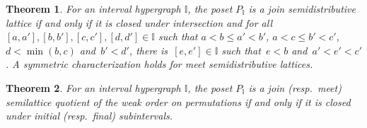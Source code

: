 \documentclass[reqno]{amsart}
\newtheorem{theoremA}{Theorem}
\theoremstyle{definition}
\newcommand{\II}{\mathbb I} %
\begin{document}
\begin{theoremA}
\label{thm:semidistributiveLatticeI}
%
%
For an interval hypergraph $\II$, the poset $P_\II$ is a join semidistributive lattice if and only if it is closed under intersection and
for all~$[a,a'], [b,b'], [c,c'], [d,d'] \in \II$ such that ${a < b \le a' < b'}$, $a < c \le b' < c'$, $d < \min(b, c)$ and~$b' < d'$, there is~$[e,e'] \in \II$ such that~$e < b$ and~${a' < e' < c'}$.
A symmetric characterization holds for meet semidistributive lattices.
\end{theoremA}

\begin{theoremA}
\label{thm:quotientLatticeI}
For an interval hypergraph $\II$, the poset $P_\II$ is a join (resp.~meet) semilattice quotient of the weak order on permutations if and only if it is closed under initial (resp.~final) subintervals.
\end{theoremA}
\end{document}
